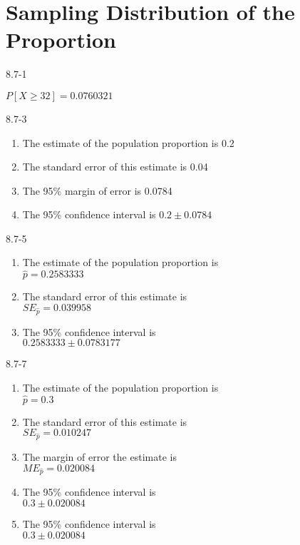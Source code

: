 \setcounter{chapter}{7}\chapter{Sampling Distribution of the Proportion}
\begin{exsol@solution}{8.7-1}

    $P[ X \ge 32 ] = 0.0760321$
\end{exsol@solution}
\begin{exsol@solution}{8.7-3}
\begin{enumerate}
\item The estimate of the population proportion is 0.2
\item The standard error of this estimate is 0.04
\item The 95\% margin of error is 0.0784
\item The 95\% confidence interval is $0.2 \pm 0.0784$
\end{enumerate}

\end{exsol@solution}
\begin{exsol@solution}{8.7-5}
\begin{enumerate}
\item	The estimate of the population proportion is \\ $\hat{p} = 0.2583333$
\item	The standard error of this estimate is \\ $SE_{\hat{p}} = 0.039958$
\item	The 95\% confidence interval is \\ $0.2583333 \pm 0.0783177$
\end{enumerate}
\end{exsol@solution}
\begin{exsol@solution}{8.7-7}
\begin{enumerate}
\item	The estimate of the population proportion is \\ $\hat{p} = 0.3$
\item	The standard error of this estimate is \\ $SE_{\hat{p}} = 0.010247$
\item The margin of error the estimate is \\ $ME_{\hat{p}} = 0.020084$
\item	The 95\% confidence interval is \\ $0.3 \pm 0.020084$
\item	The 95\% confidence interval is \\ $0.3 \pm 0.020084$
\end{enumerate}
\end{exsol@solution}
